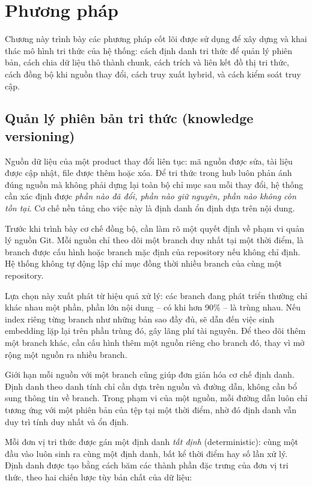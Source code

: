 \section{Phương pháp}

Chương này trình bày các phương pháp cốt lõi được sử dụng để xây dựng và khai thác mô hình tri thức của hệ thống: cách định danh tri thức để quản lý phiên bản, cách chia dữ liệu thô thành chunk, cách trích và liên kết đồ thị tri thức, cách đồng bộ khi nguồn thay đổi, cách truy xuất hybrid, và cách kiểm soát truy cập. 

\subsection{Quản lý phiên bản tri thức (knowledge versioning)}

Nguồn dữ liệu của một product thay đổi liên tục: mã nguồn được sửa, tài liệu được cập nhật, file được thêm hoặc xóa. Để tri thức trong hub luôn phản ánh đúng nguồn mà không phải dựng lại toàn bộ chỉ mục sau mỗi thay đổi, hệ thống cần xác định được \textit{phần nào đã đổi, phần nào giữ nguyên, phần nào không còn tồn tại}. Cơ chế nền tảng cho việc này là định danh ổn định dựa trên nội dung.

Trước khi trình bày cơ chế đồng bộ, cần làm rõ một quyết định về phạm vi quản lý nguồn Git. Mỗi nguồn chỉ theo dõi một branch duy nhất tại một thời điểm, là branch được cấu hình hoặc branch mặc định của repository nếu không chỉ định. Hệ thống không tự động lập chỉ mục đồng thời nhiều branch của cùng một repository.

Lựa chọn này xuất phát từ hiệu quả xử lý: các branch đang phát triển thường chỉ khác nhau một phần, phần lớn nội dung -- có khi hơn 90\% -- là trùng nhau. Nếu index riêng từng branch như những bản sao đầy đủ, sẽ dẫn đến việc sinh embedding lặp lại trên phần trùng đó, gây lãng phí tài nguyên. Để theo dõi thêm một branch khác, cần cấu hình thêm một nguồn riêng cho branch đó, thay vì mở rộng một nguồn ra nhiều branch. 

Giới hạn mỗi nguồn với một branch cũng giúp đơn giản hóa cơ chế định danh. Định danh theo danh tính chỉ cần dựa trên nguồn và đường dẫn, không cần bổ sung thông tin về branch. Trong phạm vi của một nguồn, mỗi đường dẫn luôn chỉ tương ứng với một phiên bản của tệp tại một thời điểm, nhờ đó định danh vẫn duy trì tính duy nhất và ổn định.

Mỗi đơn vị tri thức được gán một định danh \textit{tất định} (deterministic): cùng một đầu vào luôn sinh ra cùng một định danh, bất kể thời điểm hay số lần xử lý. Định danh được tạo bằng cách băm các thành phần đặc trưng của đơn vị tri thức, theo hai chiến lược tùy bản chất của dữ liệu:

